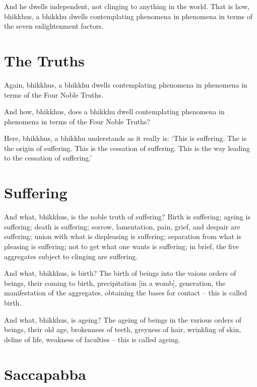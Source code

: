 \enlargethispage{\baselineskip}


\englishPage

And he dwells independent, not clinging to anything in the world. That is how,
bhikkhus, a bhikkhu dwells contemplating phenomena in phenomena in terms of the
seven enlightenment factors.


\section{The Truths}

Again, bhikkhus, a bhikkhu dwells contemplating phenomena in phenomena in terms
of the Four Noble Truths.

And how, bhikkhus, does a bhikkhu dwell contemplating phenomena in phenomena in
terms of the Four Noble Truths?

Here, bhikkhus, a bhikkhu understands as it really is: `This is suffering. The
is the origin of suffering. This is the cessation of suffering. This is the way
leading to the cessation of suffering.'

\section{Suffering}

And what, bhikkhus, is the noble truth of suffering? Birth is suffering; ageing
is suffering; death is suffering; sorrow, lamentation, pain, grief, and despair
are suffering; union with what is displeasing is suffering; separation from what
is pleasing is suffering; not to get what one wants is suffering; in brief, the
five aggregates subject to clinging are suffering.

And what, bhikkhus, is birth? The birth of beings into the vaious orders of
beings, their coming to birth, precipitation [in a womb], generation, the
manifestation of the aggregates, obtaining the bases for contact -- this is
called birth.

And what, bhikkhus, is ageing? The ageing of beings in the various orders of
beings, their old age, brokenness of teeth, greyness of hair, wrinkling of skin,
deline of life, weakness of faculties -- this is called ageing.

\paliPage

\section*{Saccapabba}

